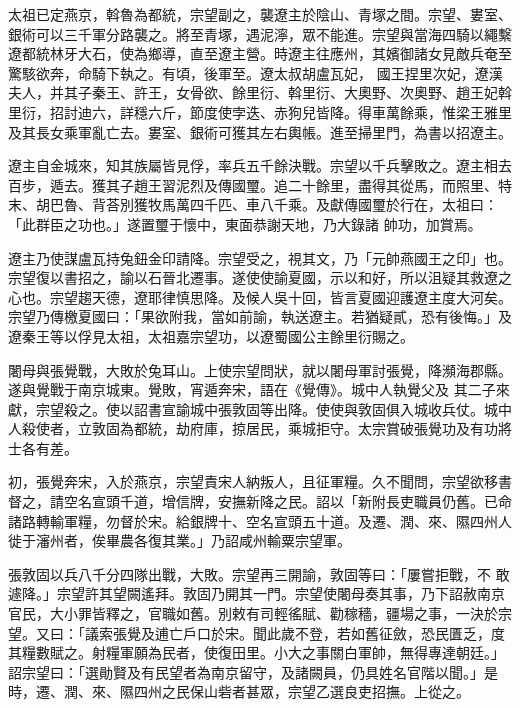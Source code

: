 \begin{pinyinscope}
 太祖已定燕京，斡魯為都統，宗望副之，襲遼主於陰山、青塚之間。宗望、婁室、銀術可以三千軍分路襲之。將至青塚，遇泥濘，眾不能進。宗望與當海四騎以繩繫遼都統林牙大石，使為鄉導，直至遼主營。時遼主往應州，其嬪御諸女見敵兵奄至驚駭欲奔，命騎下執之。有頃，後軍至。遼太叔胡盧瓦妃，
 國王捏里次妃，遼漢夫人，并其子秦王、許王，女骨欲、餘里衍、斡里衍、大奧野、次奧野、趙王妃斡里衍，招討迪六，詳穩六斤，節度使孛迭、赤狗兒皆降。得車萬餘乘，惟梁王雅里及其長女乘軍亂亡去。婁室、銀術可獲其左右輿帳。進至掃里門，為書以招遼主。



 遼主自金城來，知其族屬皆見俘，率兵五千餘決戰。宗望以千兵擊敗之。遼主相去百步，遁去。獲其子趙王習泥烈及傳國璽。追二十餘里，盡得其從馬，而照里、特末、胡巴魯、背荅別獲牧馬萬四千匹、車八千乘。及獻傳國璽於行在，太祖曰：「此群臣之功也。」遂置璽于懷中，東面恭謝天地，乃大錄諸
 帥功，加賞焉。



 遼主乃使謀盧瓦持兔鈕金印請降。宗望受之，視其文，乃「元帥燕國王之印」也。宗望復以書招之，諭以石晉北遷事。遂使使諭夏國，示以和好，所以沮疑其救遼之心也。宗望趨天德，遼耶律慎思降。及候人吳十回，皆言夏國迎護遼主度大河矣。宗望乃傳檄夏國曰：「果欲附我，當如前諭，執送遼主。若猶疑貳，恐有後悔。」及遼秦王等以俘見太祖，太祖嘉宗望功，以遼蜀國公主餘里衍賜之。



 闍母與張覺戰，大敗於兔耳山。上使宗望問狀，就以闍母軍討張覺，降瀕海郡縣。遂與覺戰于南京城東。覺敗，宵遁奔宋，語在《覺傳》。城中人執覺父及
 其二子來獻，宗望殺之。使以詔書宣諭城中張敦固等出降。使使與敦固俱入城收兵仗。城中人殺使者，立敦固為都統，劫府庫，掠居民，乘城拒守。太宗賞破張覺功及有功將士各有差。



 初，張覺奔宋，入於燕京，宗望責宋人納叛人，且征軍糧。久不聞問，宗望欲移書督之，請空名宣頭千道，增信牌，安撫新降之民。詔以「新附長吏職員仍舊。已命諸路轉輸軍糧，勿督於宋。給銀牌十、空名宣頭五十道。及遷、潤、來、隰四州人徙于瀋州者，俟畢農各復其業。」乃詔咸州輸粟宗望軍。



 張敦固以兵八千分四隊出戰，大敗。宗望再三開諭，敦固等曰：「屢嘗拒戰，不
 敢遽降。」宗望許其望闕遙拜。敦固乃開其一門。宗望使闍母奏其事，乃下詔赦南京官民，大小罪皆釋之，官職如舊。別敕有司輕徭賦、勸稼穡，疆場之事，一決於宗望。又曰：「議索張覺及逋亡戶口於宋。聞此歲不登，若如舊征斂，恐民匱乏，度其糧數賦之。射糧軍願為民者，使復田里。小大之事關白軍帥，無得專達朝廷。」詔宗望曰：「選勛賢及有民望者為南京留守，及諸闕員，仍具姓名官階以聞。」是時，遷、潤、來、隰四州之民保山砦者甚眾，宗望乙選良吏招撫。上從之。




\end{pinyinscope}
